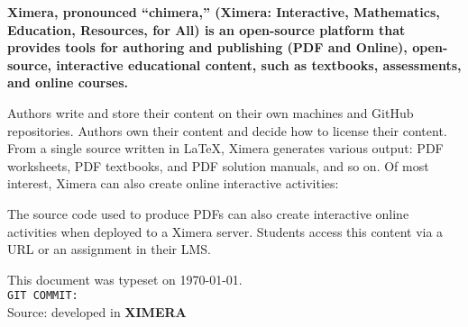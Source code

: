   \pagestyle{empty}
  \pagecolor{otherbkgndcr}
  \boldmath %
  \bfseries %
  \color{txtcr}
  \sffamily\flushleft%
  Ximera, pronounced ``chimera,'' (\textbf{X}imera: \textbf{I}nteractive,
  \textbf{M}athematics, \textbf{E}ducation,
  \textbf{R}esources, for \textbf{A}ll) is an open-source platform that provides
  tools for
  authoring and publishing (PDF and Online), open-source, interactive educational
  content, such as textbooks, assessments, and online courses.
  
  
  Authors  write and store their content on their own
  machines and GitHub repositories.
  Authors own their content and decide how to license their content. From a
  single source written in \LaTeX, Ximera generates various output: PDF
  worksheets,
  PDF textbooks, and	PDF solution manuals, and so on. Of most interest,
  Ximera can
  also create online interactive activities:
  \begin{center}
\end{center}
  The source code used to produce PDFs can also create interactive online
  activities when deployed to a Ximera server. Students access this content via a
  URL or an assignment in their LMS.
  
\vfill

  \small This document was typeset on \today. \hfill \Large\textsf{\ccbyncsa}\\
  \small\texttt{GIT COMMIT: }\\
  \small Source: {\hypersetup{allcolors=txtcr}\docURL}\hfill developed in \textbf{XIMERA}
